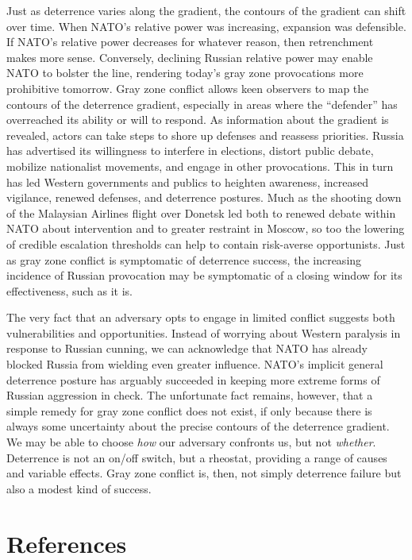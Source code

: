 \documentclass[
]{article}
\begin{document}
Just as deterrence varies along the gradient, the contours of the gradient can shift over time. When NATO's relative power was increasing, expansion was defensible. If NATO's relative power decreases for whatever reason, then retrenchment makes more sense. Conversely, declining Russian relative power may enable NATO to bolster the line, rendering today's gray zone provocations more prohibitive tomorrow. Gray zone conflict allows keen observers to map the contours of the deterrence gradient, especially in areas where the ``defender'' has overreached its ability or will to respond. As information about the gradient is revealed, actors can take steps to shore up defenses and reassess priorities. Russia has advertised its willingness to interfere in elections, distort public debate, mobilize nationalist movements, and engage in other provocations. This in turn has led Western governments and publics to heighten awareness, increased vigilance, renewed defenses, and deterrence postures. Much as the shooting down of the Malaysian Airlines flight over Donetsk led both to renewed debate within NATO about intervention and to greater restraint in Moscow, so too the lowering of credible escalation thresholds can help to contain risk-averse opportunists. Just as gray zone conflict is symptomatic of deterrence success, the increasing incidence of Russian provocation may be symptomatic of a closing window for its effectiveness, such as it is.

The very fact that an adversary opts to engage in limited conflict suggests both vulnerabilities and opportunities. Instead of worrying about Western paralysis in response to Russian cunning, we can acknowledge that NATO has already blocked Russia from wielding even greater influence. NATO's implicit general deterrence posture has arguably succeeded in keeping more extreme forms of Russian aggression in check. The unfortunate fact remains, however, that a simple remedy for gray zone conflict does not exist, if only because there is always some uncertainty about the precise contours of the deterrence gradient. We may be able to choose \emph{how} our adversary confronts us, but not \emph{whether}. Deterrence is not an on/off switch, but a rheostat, providing a range of causes and variable effects. Gray zone conflict is, then, not simply deterrence failure but also a modest kind of success.

\newpage

\hypertarget{references}{%
\section*{References}\label{references}}
\end{document}
